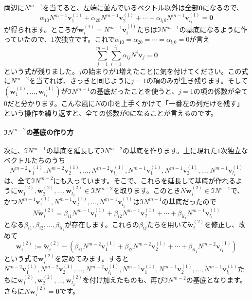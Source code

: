 両辺に$N^{m - 1}$を当てると、左端に並んでいるベクトル以外は全部$\bm{0}$になるので、
\[
\alpha_{10} N^{m - 1}\bm{v}^{(1)}_1 + \alpha_{20} N^{m - 1} \bm{v}^{(1)}_2 + \cdots + \alpha_{l_1 0} N^{m - 1}\bm{v}^{(1)}_{l_1} = \bm{0}
\]
が得られます。ところが$\bm{w}^{(1)}_i = N^{m - 1} \bm{v}^{(i)}_i$たちは$\Im N^{m - 1}$の基底になるように作っていたので、$1$次独立です。これで$\alpha_{10} = \alpha_{20} = \cdots = \alpha_{l_1 0} = 0$が言え
\[
\sum_{j = 1}^{m - 1} \sum_{i = 1}^{l_1} \alpha_{ij} N^i \bm{v}_j = \bm{0}
\]
という式が残りました。$j$の始まりが$1$増えたことに気を付けてください。この式に$N^{m - 2}$を当てれば、さっきと同じように$j = 1$の項のみが生き残ります。そして$(\bm{w}^{(1)}_1, \ldots, \bm{w}^{(1)}_{l_1})$が$\Im N^{m - 1}$の基底だったことを使うと、$j = 1$の項の係数が全て$0$だと分かります。こんな風に$N$の巾を上手くかけて「一番左の列だけを残す」という操作を繰り返すと、全ての係数が$0$になることが言えるのです。

\paragraph{$\Im N^{m - 2}$の基底の作り方}

次に、$\Im N^{m - 1}$の基底を延長して$\Im N^{m - 2}$の基底を作ります。上に現れた$1$次独立なベクトルたちのうち
\[
N^{m - 2} \bm{v}^{(1)}_{1}, N^{m - 2} \bm{v}^{(1)}_{2}, \ldots, N^{m - 2} \bm{v}^{(1)}_{l_1}, N^{m - 1} \bm{v}^{(1)}_{1}, N^{m - 1} \bm{v}^{(1)}_{2}, \ldots, N^{m - 1} \bm{v}^{(1)}_{l_1}
\]
は、全て$\Im N^{m - 2}$にも入っています。そこで、これらを延長して基底が作れるように$\tilde{\bm{w}}^{(2)}_1, \tilde{\bm{w}}^{(2)}_2, \ldots, \tilde{\bm{w}}^{(2)}_{l_2} \in \Im N^{m - 2}$を取ります。このとき$N \tilde{\bm{w}}^{(2)}_i \in \Im N^{i - 1}$で、かつ$N^{m - 1}\bm{v}^{(1)}_1, N^{m - 1}\bm{v}^{(1)}_2, \ldots, N^{m - 1}\bm{v}^{(1)}_{l_1}$は$\Im N^{m - 1}$の基底だったので
\[
N \tilde{\bm{w}}^{(2)}_i = \beta_{i1} N^{m - 1}\bm{v}^{(1)}_1 + \beta_{i2} N^{m - 1}\bm{v}^{(1)}_2 + \cdots + \beta_{i l_1} N^{m - 1}\bm{v}^{(1)}_{l_1}
\]
となる$\beta_{i1}, \beta_{i2}, \ldots, \beta_{i l_1}$が存在します。これらの$\beta_{ij}$たちを用いて$\bm{\tilde{w}}^{(2)}_i$を修正し、改めて
\[
\bm{w}^{(2)}_i := \tilde{\bm{w}}^{(2)}_i - (\beta_{i1} N^{m - 2}\bm{v}^{(1)}_1 + \beta_{i2} N^{m - 2}\bm{v}^{(1)}_2 + \cdots + \beta_{i l_1} N^{m - 2}\bm{v}^{(1)}_{l_1})
\]
という式で$\bm{w}^{(2)}_i$を定めてみます。すると$N^{m - 2} \bm{v}^{(1)}_{1}, N^{m - 2} \bm{v}^{(1)}_{2}, \ldots, N^{m - 2} \bm{v}^{(1)}_{l_1}, N^{m - 1} \bm{v}^{(1)}_{1}, N^{m - 1} \bm{v}^{(1)}_{2}, \ldots, N^{m - 1} \bm{v}^{(1)}_{l_1}$たちに$\bm{w}^{(2)}_1, \bm{w}^{(2)}_2, \ldots, \bm{w}^{(2)}_{l_2}$を付け加えたものも、再び$\Im N^{m - 2}$の基底となります。さらに$N \bm{w}^{(2)}_i = \bm{0}$です。

